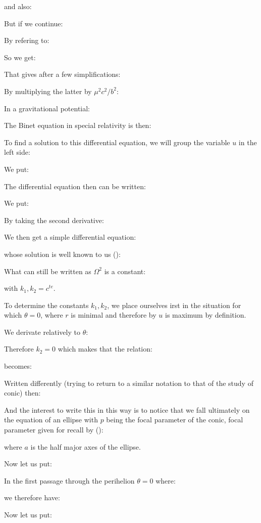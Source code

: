 	and also:
	
	But if we continue:
	
	By refering to:
	
	So we get:
	
	That gives after a few simplifications:
		
	By multiplying the latter by $\mu^2c^2/b^2$:
	
	In a gravitational potential:
	
	The Binet equation in special relativity is then:
	
	To find a solution to this differential equation, we will group the variable $u$ in the left side:
	
	We put:
	
	The differential equation then can be written:
	
	We put:
	
	By taking the second derivative:
	
	We then get a simple differential equation:
	
	whose solution is well known to us ():
	
	What can still be written as $\Omega^2$ is a constant:
	
	with $k_1,k_2=c^{te}$.

	To determine the constants $k_1,k_2$, we place ourselves irst in the situation for which $\theta=0$, where $r$ is minimal and therefore by $u$ is maximum by definition.
	
	We derivate relatively to $\theta$:
	
	Therefore $k_2=0$ which makes that the relation:
	
	becomes:
	
	Written differently (trying to return to a similar notation to that of the study of conic) then:
	
	And the interest to write this in this way is to notice that we fall ultimately on the equation of an ellipse with $p$ being the focal parameter of the conic, focal parameter given for recall by ():
	
	where $a$ is the half major axes of the ellipse.
	
	Now let us put:
	
	In the first passage through the perihelion $\theta=0$ where:
	
	we therefore have:
	
	Now let us put:
	
